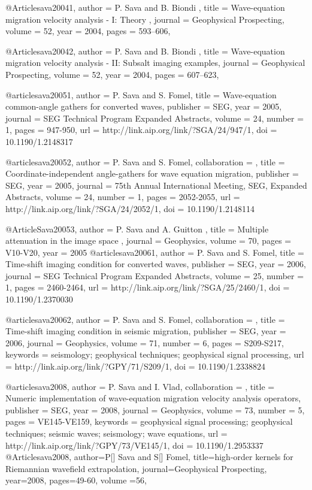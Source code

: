 @Article{sava20041,
 author =  { P. Sava and B. Biondi },
 title =   { Wave-equation migration velocity analysis - {I}: {Theory} },
 journal = {Geophysical Prospecting},
 volume = {52},
 year =   {2004},
 pages =  {593--606},
}

@Article{sava20042,
 author =  { P. Sava and B. Biondi },
 title =   { Wave-equation migration velocity analysis - {II}:
{Subsalt} imaging examples},
 journal = {Geophysical Prospecting},
 volume = {52},
 year =   {2004},
 pages =  {607--623},
}

@article{sava20051,
  author =	 {P. Sava and S. Fomel},
  title =	 {Wave-equation common-angle gathers for converted
                  waves},
  publisher =	 {SEG},
  year =	 2005,
  journal =	 {SEG Technical Program Expanded Abstracts},
  volume =	 24,
  number =	 1,
  pages =	 {947-950},
  url =		 {http://link.aip.org/link/?SGA/24/947/1},
  doi =		 {10.1190/1.2148317}
}

@article{sava20052,
author = {P. Sava and S. Fomel},
collaboration = {},
title = {Coordinate-independent angle-gathers for wave equation migration},
publisher = {SEG},
year = {2005},
journal = {75th Annual International Meeting, SEG, Expanded Abstracts},
volume = {24},
number = {1},
pages = {2052-2055},
url = {http://link.aip.org/link/?SGA/24/2052/1},
doi = {10.1190/1.2148114}
}

@Article{Sava20053,
  author =	 { P. Sava and A. Guitton },
  title =	 { Multiple attenuation in the image space },
  journal =	 {Geophysics},
  volume =	 70,
  pages =	 {V10-V20},
  year =	 2005
}
@article{sava20061,
  author =	 {P. Sava and S. Fomel},
  title =	 {Time-shift imaging condition for converted waves},
  publisher =	 {SEG},
  year =	 2006,
  journal =	 {SEG Technical Program Expanded Abstracts},
  volume =	 25,
  number =	 1,
  pages =	 {2460-2464},
  url =		 {http://link.aip.org/link/?SGA/25/2460/1},
  doi =		 {10.1190/1.2370030}
}


@article{sava20062,
author = {P. Sava and S. Fomel},
collaboration = {},
title = {Time-shift imaging condition in seismic migration},
publisher = {SEG},
year = {2006},
journal = {Geophysics},
volume = {71},
number = {6},
pages = {S209-S217},
keywords = {seismology; geophysical techniques; geophysical signal processing},
url = {http://link.aip.org/link/?GPY/71/S209/1},
doi = {10.1190/1.2338824}
}

@article{sava2008,
author = {P. Sava and I. Vlad},
collaboration = {},
title = {Numeric implementation of wave-equation migration velocity analysis operators},
publisher = {SEG},
year = {2008},
journal = {Geophysics},
volume = {73},
number = {5},
pages = {VE145-VE159},
keywords = {geophysical signal processing; geophysical techniques; seismic waves; seismology; wave equations},
url = {http://link.aip.org/link/?GPY/73/VE145/1},
doi = {10.1190/1.2953337}
}
@Article{sava2008,
author={P[] Sava and S[] Fomel},
title={high-order kernels for Riemannian wavefield extrapolation},
journal={Geophysical Prospecting},
year=2008,
pages={49-60},
volume ={56},
}

